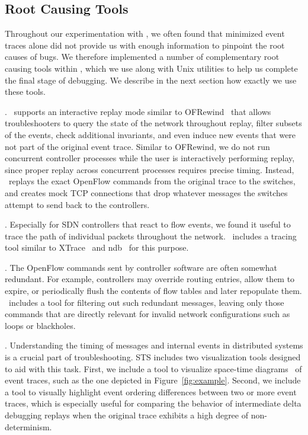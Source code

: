 \subsection{Root Causing Tools}
\label{subsec:root_causing}

Throughout our experimentation with \projectname, we often found that
minimized event traces alone did not provide us with enough information to
pinpoint the root causes of bugs. We therefore implemented a number of
complementary root
causing tools within \projectname,
which we use along with Unix utilities to help us complete the final
stage of debugging. We describe in the next section how exactly we use
these tools.

. \projectname~supports an interactive replay mode
similar to OFRewind~\cite{ofrewind} that allows troubleshooters to query the
state of the network throughout replay, filter subsets of the events, check
additional invariants, and
even induce new events that were not part of the original event trace.
Similar to OFRewind, we do not run concurrent controller processes while the
user is interactively performing replay, since proper replay across
concurrent processes requires precise timing.
Instead, \projectname~replays the exact OpenFlow commands from the
original trace to the switches, and creates mock TCP connections that drop
whatever messages the switches attempt to send back to the controllers.

. Especially for SDN controllers that react to
flow events, we found it useful to trace the path of individual
packets throughout the network. \projectname~includes a tracing tool similar
to XTrace~\cite{fonseca2007x} and ndb~\cite{handigol2012debugger} for this
purpose.

. The OpenFlow commands sent by controller software
are often somewhat redundant. For example, controllers may override routing
entries, allow them to expire, or periodically flush the
contents of flow tables and later repopulate them. \projectname~includes a
tool for filtering out such redundant messages,
leaving only those commands that are directly relevant for invalid network
configurations such as loops or blackholes.

. Understanding the timing of messages and internal
events in distributed systems is a crucial part of troubleshooting.
STS includes two visualization tools designed to aid with this task. First, we
include a tool to visualize space-time diagrams~\cite{Lamport:1978:TCO:359545.359563}
of event traces, such as the one depicted in Figure~\ref{fig:example}.
Second, we include a tool to visually highlight event ordering differences
between two or more event traces, which is especially useful for comparing the behavior of
intermediate delta debugging replays when the original trace exhibits a high degree of non-determinism.

